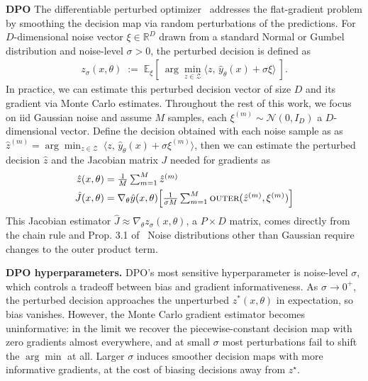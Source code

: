 \textbf{DPO} The differentiable perturbed optimizer~\citep{berthetLearningDifferentiablePerturbed2020} addresses the flat-gradient problem by smoothing the decision map via random perturbations of the predictions. For $D$-dimensional noise vector
$\xi \in \mathbb{R}^D$ drawn from a standard Normal or Gumbel distribution and noise-level $\sigma>0$, the perturbed decision is defined as
\begin{align}
z_\sigma(x, \theta)
\;:=\;
\mathbb{E}_{\xi}[
~
\arg\min_{z\in\mathcal{Z}} \langle z,\, \hat{y}_{\theta}(x) + \sigma \xi\rangle
~].
\end{align}
In practice, we can estimate this perturbed decision vector of size $D$ and its gradient via Monte Carlo estimates. Throughout the rest of this work, we focus on iid Gaussian noise and assume $M$ samples, each $\xi^{(m)} \sim \mathcal{N}(0, I_D)$ a $D$-dimensional vector. Define the decision obtained with each noise sample as as $\hat{z}^{(m)} {=} \arg\min_{z\in\mathcal{Z}} 
~\langle z,\, \hat{y}_{\theta}(x) + \sigma \xi^{(m)} \rangle$, then we can estimate the perturbed decision $\hat{z}$ and the Jacobian matrix $J$ needed for gradients as
\begin{align}
\hat{z}(x, \theta)
&=
\textstyle 
\frac{1}{M} \sum_{m=1}^M
\hat{z}^{(m)}
\\ \notag 
\hat{J}(x, \theta) &= 
\nabla_{\theta} \hat{y}(x,\theta) \Big[ 
\textstyle
\frac{1}{\sigma M} 
\sum_{m=1}^M \textsc{outer}(\hat{z}^{(m)}, \xi^{(m)})
\Big] 
\end{align}
This Jacobian estimator 
$\hat{J} \approx \nabla_{\theta} {z}_{\sigma}(x, \theta)$, a $P\times D$ matrix, comes directly from the chain rule and Prop. 3.1 of \citeauthor{berthetLearningDifferentiablePerturbed2020}~Noise distributions other than Gaussian require changes to the outer product term.

\textbf{DPO hyperparameters.}
DPO's most sensitive hyperparameter is noise-level $\sigma$, which controls a tradeoff between bias and gradient informativeness. As $\sigma \rightarrow 0^+$, the perturbed decision approaches the unperturbed $z^*(x,\theta)$ in expectation, so bias vanishes. However, the Monte Carlo gradient estimator becomes uninformative: in the limit we recover the piecewise-constant decision map with zero gradients almost everywhere, and at small $\sigma$ most perturbations fail to shift the $\arg\min$ at all. Larger $\sigma$ induces smoother decision maps with more informative gradients, at the cost of biasing decisions away from $z^\star$.

